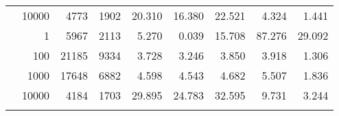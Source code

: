 \begin{table}
\begin{tabular}{rrrrrrrrr}
	            
					 &  
					 
					\multirow{ 1 }{*}{ 10000 } &
					
						
							    
							     4773  & 1902  
	                           & 20.310 & 16.380 & 22.521
	                           & 4.324 & 1.441  \\
	                
	            
	        
				\noalign{\smallskip}\hline
				\multirow{ 4 }{*}{ 500000 } &
				
					
					 
					\multirow{ 1 }{*}{ 1 } &
					
						
							    
							     5967  & 2113  
	                           & 5.270 & 0.039 & 15.708
	                           & 87.276 & 29.092  \\
	                
	            
					 &  
					 
					\multirow{ 1 }{*}{ 100 } &
					
						
							    
							     21185  & 9334  
	                           & 3.728 & 3.246 & 3.850
	                           & 3.918 & 1.306  \\
	                
	            
					 &  
					 
					\multirow{ 1 }{*}{ 1000 } &
					
						
							    
							     17648  & 6882  
	                           & 4.598 & 4.543 & 4.682
	                           & 5.507 & 1.836  \\
	                
	            
					 &  
					 
					\multirow{ 1 }{*}{ 10000 } &
					
						
							    
							     4184  & 1703  
	                           & 29.895 & 24.783 & 32.595
	                           & 9.731 & 3.244  \\
	                
	            
	        
				\noalign{\smallskip}\hline
				\multirow{ 4 }{*}{ 1000000 } &
				

\end{tabular}
\end{table}
